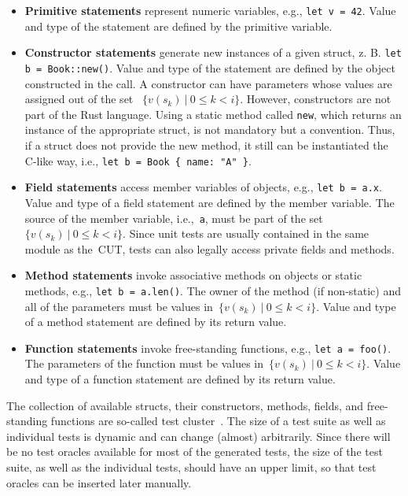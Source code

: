 \documentclass{article}
\begin{document}
\begin{itemize} 
    \item \textbf{Primitive statements} represent numeric variables, e.g., \lstinline{let v = 42}. Value and type of the statement are defined by the primitive variable.
    \item \textbf{Constructor statements} generate new instances of a given struct, z. B. \lstinline{let b = Book::new()}. Value and type of the statement are defined by the object constructed in the call. A constructor can have parameters whose values are assigned out of the set ~$\{v(s_k)~|~0 \leq k < i\}$. However, constructors are not part of the Rust language. Using a static method called \lstinline{new}, which returns an instance of the appropriate struct, is not mandatory but a convention. Thus, if a struct does not provide the new method, it still can be instantiated the C-like way, i.e., \lstinline|let b = Book { name: "A" }|. 
    \item \textbf{Field statements} access member variables of objects, e.g., \lstinline{let b = a.x}. Value and type of a field statement are defined by the member variable. The source of the member variable, i.e.,~\lstinline{a}, must be part of the set~$\{v(s_k)~|~0 \leq k < i\}$. Since unit tests are usually contained in the same module as the~\ac{CUT}, tests can also legally access private fields and methods. 
    \item \textbf{Method statements} invoke associative methods on objects or static methods, e.g., \lstinline{let b = a.len()}. The owner of the method (if non-static) and all of the parameters must be values in~${\{v(s_k)~|~0 \leq k < i\}}$. Value and type of a method statement are defined by its return value.
    \item \textbf{Function statements} invoke free-standing functions, e.g., \lstinline{let a = foo()}. The parameters of the function must be values in~$\{v(s_k)~|~0 \leq k < i\}$. Value and type of a function statement are defined by its return value.
\end{itemize}

The collection of available structs, their constructors, methods, fields, and free-standing functions are so-called test cluster~\cite{Fraser_2011}. The size of a test suite as well as individual tests is dynamic and can change (almost) arbitrarily. Since there will be no test oracles available for most of the generated tests, the size of the test suite, as well as the individual tests, should have an upper limit, so that test oracles can be inserted later manually. 
\end{document}
